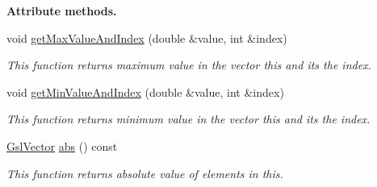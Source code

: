 \begin{Indent}{\bf Attribute methods.}
\begin{DoxyCompactItemize}
void \hyperlink{class_q_u_e_s_o_1_1_gsl_vector_ae77a2147d9185b1fd9b55b836cba7496}{get\-Max\-Value\-And\-Index} (double \&value, int \&index)
\begin{DoxyCompactList}\small\item\em This function returns maximum value in the vector {\ttfamily this} and its the index. \end{DoxyCompactList}\item 
void \hyperlink{class_q_u_e_s_o_1_1_gsl_vector_a22094d1f67f612646f280a700f85c542}{get\-Min\-Value\-And\-Index} (double \&value, int \&index)
\begin{DoxyCompactList}\small\item\em This function returns minimum value in the vector {\ttfamily this} and its the index. \end{DoxyCompactList}\item 
\hyperlink{class_q_u_e_s_o_1_1_gsl_vector}{Gsl\-Vector} \hyperlink{class_q_u_e_s_o_1_1_gsl_vector_a2e1d40289945c31fdf688fef8e9ea726}{abs} () const 
\begin{DoxyCompactList}\small\item\em This function returns absolute value of elements in {\ttfamily this}. \end{DoxyCompactList}\end{DoxyCompactItemize}
\end{Indent}
